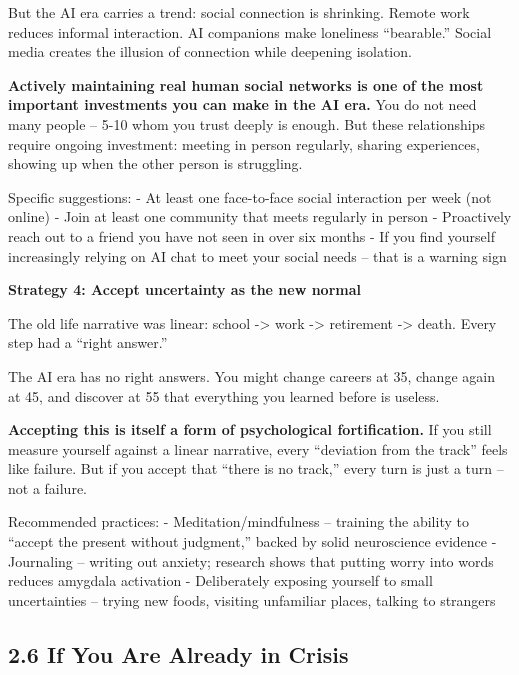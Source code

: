 But the AI era carries a trend: social connection is shrinking. Remote
work reduces informal interaction. AI companions make loneliness
``bearable.'' Social media creates the illusion of connection while
deepening isolation.

\textbf{Actively maintaining real human social networks is one of the
most important investments you can make in the AI era.} You do not need
many people -- 5-10 whom you trust deeply is enough. But these
relationships require ongoing investment: meeting in person regularly,
sharing experiences, showing up when the other person is struggling.

Specific suggestions: - At least one face-to-face social interaction per
week (not online) - Join at least one community that meets regularly in
person - Proactively reach out to a friend you have not seen in over six
months - If you find yourself increasingly relying on AI chat to meet
your social needs -- that is a warning sign

\textbf{Strategy 4: Accept uncertainty as the new normal}

The old life narrative was linear: school -\textgreater{} work
-\textgreater{} retirement -\textgreater{} death. Every step had a
``right answer.''

The AI era has no right answers. You might change careers at 35, change
again at 45, and discover at 55 that everything you learned before is
useless.

\textbf{Accepting this is itself a form of psychological fortification.}
If you still measure yourself against a linear narrative, every
``deviation from the track'' feels like failure. But if you accept that
``there is no track,'' every turn is just a turn -- not a failure.

Recommended practices: - Meditation/mindfulness -- training the ability
to ``accept the present without judgment,'' backed by solid neuroscience
evidence - Journaling -- writing out anxiety; research shows that
putting worry into words reduces amygdala activation - Deliberately
exposing yourself to small uncertainties -- trying new foods, visiting
unfamiliar places, talking to strangers

\subsection{2.6 If You Are Already in
Crisis}\label{if-you-are-already-in-crisis}

